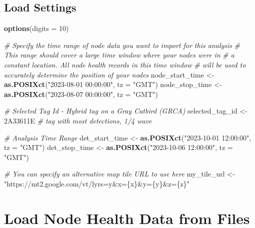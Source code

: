 \documentclass[
]{book}
\newenvironment{Shaded}{\begin{snugshade}}{\end{snugshade}}
\newcommand{\AttributeTok}[1]{\textcolor[rgb]{0.13,0.29,0.53}{#1}}
\newcommand{\CommentTok}[1]{\textcolor[rgb]{0.56,0.35,0.01}{\textit{#1}}}
\newcommand{\DecValTok}[1]{\textcolor[rgb]{0.00,0.00,0.81}{#1}}
\newcommand{\FunctionTok}[1]{\textcolor[rgb]{0.13,0.29,0.53}{\textbf{#1}}}
\newcommand{\NormalTok}[1]{#1}
\newcommand{\OtherTok}[1]{\textcolor[rgb]{0.56,0.35,0.01}{#1}}
\newcommand{\StringTok}[1]{\textcolor[rgb]{0.31,0.60,0.02}{#1}}
\begin{document}
\subsection{Load Settings}\label{load-settings-2}

\begin{Shaded}
\begin{Highlighting}[]
\FunctionTok{options}\NormalTok{(}\AttributeTok{digits =} \DecValTok{10}\NormalTok{)}

\CommentTok{\# Specify the time range of node data you want to import for this analysis}
\CommentTok{\#   This range should cover a large time window where your nodes were in}
\CommentTok{\#   a constant location.  All node health records in this time window}
\CommentTok{\#   will be used to accurately determine the position of your nodes}
\NormalTok{node\_start\_time }\OtherTok{\textless{}{-}} \FunctionTok{as.POSIXct}\NormalTok{(}\StringTok{"2023{-}08{-}01 00:00:00"}\NormalTok{, }\AttributeTok{tz =} \StringTok{"GMT"}\NormalTok{)}
\NormalTok{node\_stop\_time }\OtherTok{\textless{}{-}} \FunctionTok{as.POSIXct}\NormalTok{(}\StringTok{"2023{-}08{-}07 00:00:00"}\NormalTok{, }\AttributeTok{tz =} \StringTok{"GMT"}\NormalTok{)}

\CommentTok{\# Selected Tag Id {-} Hybrid tag on a Gray Catbird (GRCA)}
\NormalTok{selected\_tag\_id }\OtherTok{\textless{}{-}} \StringTok{\textquotesingle{}2A33611E\textquotesingle{}} \CommentTok{\# tag with most detections, 1/4 wave}

\CommentTok{\# Analysis Time Range}
\NormalTok{det\_start\_time }\OtherTok{\textless{}{-}} \FunctionTok{as.POSIXct}\NormalTok{(}\StringTok{"2023{-}10{-}01 12:00:00"}\NormalTok{, }\AttributeTok{tz =} \StringTok{"GMT"}\NormalTok{)}
\NormalTok{det\_stop\_time }\OtherTok{\textless{}{-}} \FunctionTok{as.POSIXct}\NormalTok{(}\StringTok{"2023{-}10{-}06 12:00:00"}\NormalTok{, }\AttributeTok{tz =} \StringTok{"GMT"}\NormalTok{)}

\CommentTok{\# You can specify an alternative map tile URL to use here}
\NormalTok{my\_tile\_url }\OtherTok{\textless{}{-}} \StringTok{"https://mt2.google.com/vt/lyrs=y\&x=\{x\}\&y=\{y\}\&z=\{z\}"}
\end{Highlighting}
\end{Shaded}

\section{Load Node Health Data from Files}\label{load-node-health-data-from-files-1}
\end{document}
